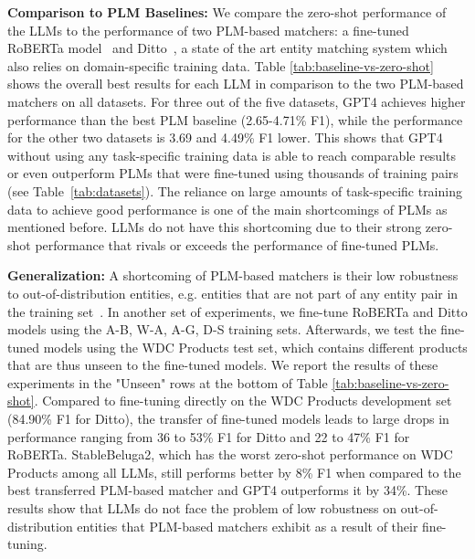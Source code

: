 \documentclass[sigconf,nonacm]{acmart}
\begin{document}
\textbf{Comparison to PLM Baselines:} We compare the zero-shot performance of the LLMs to the performance of two PLM-based matchers: a fine-tuned RoBERTa model~\cite{liu_roberta_2019} and Ditto~\cite{liDeepEntityMatching2020}, a state of the art entity matching system which also relies on domain-specific training data. Table \ref{tab:baseline-vs-zero-shot} shows the overall best results for each LLM in comparison to the two PLM-based matchers on all datasets. For three out of the five datasets, GPT4 achieves higher performance than the best PLM baseline (2.65-4.71\% F1), while the performance for the other two datasets is 3.69 and 4.49\% F1 lower. This shows that GPT4 without using any task-specific training data is able to reach comparable results or even outperform PLMs that were fine-tuned using thousands of training pairs (see Table~\ref{tab:datasets}). The reliance on large amounts of task-specific training data to achieve good performance is one of the main shortcomings of PLMs as mentioned before. LLMs do not have this shortcoming due to their strong zero-shot performance that rivals or exceeds the performance of fine-tuned PLMs.

\textbf{Generalization:} A shortcoming of PLM-based matchers is their low robustness to out-of-distribution entities, e.g. entities that are not part of any entity pair in the training set~\cite{akbarian2022probing,peeters2023wdc}. In another set of experiments, we fine-tune RoBERTa and Ditto models using the A-B, W-A, A-G, D-S training sets. Afterwards, we test the fine-tuned models using the WDC Products test set, which contains different products that are thus unseen to the fine-tuned models. We report the results of these experiments in the "Unseen" rows at the bottom of Table \ref{tab:baseline-vs-zero-shot}. 
Compared to fine-tuning directly on the WDC Products development set (84.90\% F1 for Ditto), the transfer of fine-tuned models leads to large drops in performance ranging from 36 to 53\% F1 for Ditto and 22 to 47\% F1 for RoBERTa. StableBeluga2, which has the worst zero-shot performance on WDC Products among all LLMs, still performs better by 8\% F1 when compared to the best transferred PLM-based matcher and GPT4 outperforms it by 34\%. These results show that LLMs do not face the problem of low robustness on out-of-distribution entities that PLM-based matchers exhibit as a result of their fine-tuning.
\end{document}
